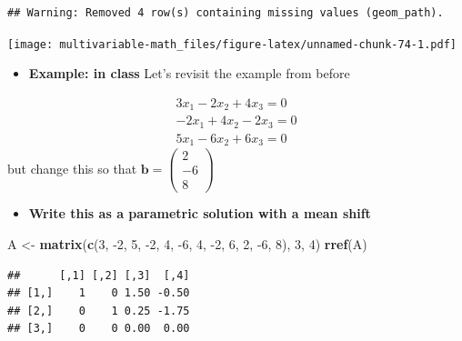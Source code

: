 \documentclass[
]{book}
\newenvironment{Shaded}{\begin{snugshade}}{\end{snugshade}}
\newcommand{\DecValTok}[1]{\textcolor[rgb]{0.00,0.00,0.81}{#1}}
\newcommand{\KeywordTok}[1]{\textcolor[rgb]{0.13,0.29,0.53}{\textbf{#1}}}
\newcommand{\NormalTok}[1]{#1}
\newcommand{\StringTok}[1]{\textcolor[rgb]{0.31,0.60,0.02}{#1}}
\providecommand{\tightlist}{%
  \setlength{\itemsep}{0pt}\setlength{\parskip}{0pt}}
\theoremstyle{definition}
\theoremstyle{definition}
\theoremstyle{definition}
\theoremstyle{definition}
\theoremstyle{remark}
\begin{document}
\begin{verbatim}
## Warning: Removed 4 row(s) containing missing values (geom_path).
\end{verbatim}

\texttt{[image: multivariable-math\_files/figure-latex/unnamed-chunk-74-1.pdf]}

\begin{itemize}
\tightlist
\item
  \textbf{Example: in class}
  Let's revisit the example from before
\end{itemize}

\[
\begin{aligned}
3 x_1 - 2 x_2 + 4 x_3 = 0 \\
- 2 x_1 + 4 x_2 - 2 x_3 = 0 \\
5 x_1 - 6 x_2 + 6 x_3 = 0
\end{aligned}
\]
but change this so that \(\mathbf{b} = \begin{pmatrix} 2 \\ -6 \\ 8 \end{pmatrix}\)

\begin{itemize}
\tightlist
\item
  \textbf{Write this as a parametric solution with a mean shift}
\end{itemize}

\begin{Shaded}
\begin{Highlighting}[]
\NormalTok{A <-}\StringTok{ }\KeywordTok{matrix}\NormalTok{(}\KeywordTok{c}\NormalTok{(}\DecValTok{3}\NormalTok{, }\DecValTok{-2}\NormalTok{, }\DecValTok{5}\NormalTok{, }\DecValTok{-2}\NormalTok{, }\DecValTok{4}\NormalTok{, }\DecValTok{-6}\NormalTok{, }\DecValTok{4}\NormalTok{, }\DecValTok{-2}\NormalTok{, }\DecValTok{6}\NormalTok{, }\DecValTok{2}\NormalTok{, }\DecValTok{-6}\NormalTok{, }\DecValTok{8}\NormalTok{), }\DecValTok{3}\NormalTok{, }\DecValTok{4}\NormalTok{)}
\KeywordTok{rref}\NormalTok{(A)}
\end{Highlighting}
\end{Shaded}

\begin{verbatim}
##      [,1] [,2] [,3]  [,4]
## [1,]    1    0 1.50 -0.50
## [2,]    0    1 0.25 -1.75
## [3,]    0    0 0.00  0.00
\end{verbatim}
\end{document}
